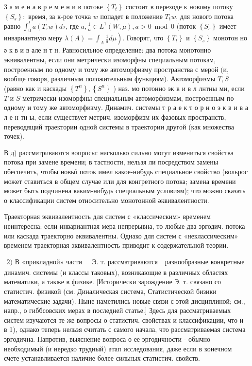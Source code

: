 \documentclass[10pt]{article}
\begin{document}
3 а м е н а в р е м е н и в потоке $\left\{T_{t}\right\}$ состоит в переходе к новому потоку $\left\{S_{s}\right\}:$ время, за к-рое точка $w$ попадет в положение $T_{t} w$, для нового потока равно $\int_{0}^{t} a\left(T_{\tau} w\right) d \tau$, где $a, \frac{1}{a} \in L^{1}(W, \mu), a>0 \bmod 0$ (поток $\left\{S_{s}\right\}$ имеет инвариантную меру $\left.\lambda(A)=\int_{A} \frac{1}{a} d \mu\right)$. Говорят, что $\left\{T_{t}\right\}$ и $\left\{S_{s}\right\}$ монотон но ә к в и в але н т н. Равносильное определение: два потока монотонно эквивалентны, если они метрически изоморфны специальным потокам, построенным по одному и тому же автоморфизму пространства с мерой (и, вообще говоря, различным положительным функциям). Автоморфизмы $T, S$ (равно как и каскады $\left\{T^{n}\right\},\left\{S^{n}\right\}$ ) наз. мо потонно эк в и в л лнтны ми, если $T$ и $S$ метрически изоморфны специальным автоморфизмам, построенным по одному и тому же автоморфизму. Динамич. системы т р а е к т о р н о э к в и в а л е н тн ы, если существует метрич. изоморфизм их фазовых пространств, переводящий траектории одной системы в траектории другой (как множества точек).



В д) рассматриваются вопросы: насколько сильно могут измениться свойства потока при замене времени; в тастности, нельзя ли посредством замены обеспечить, чтобы новыї поток имел какое-нибудь специальное свойство (вольрос может ставиться в общем случае или для конгретного потока; замена времени может быть подчинена каким-нибудь специальным условиям); что можно сказать о классификации систем относительно монотонной әквивалентности.



Траекторная эквивалентность для систем с «классическим» временем неинтересна: если инвариантная мера непрерывна, то любые два эргодич. потока или каскада траекторно әквивалентны. Однако для систем с «неклассическим» временем траекторная эквивалентность приводит к содержательной теории.



$\begin{array}{lll}2) \text { В «прикладной» части } & \text { Э. т. рассматриваются }\end{array}$ разнообразные конкретные динамич. системы (и классы таковых), возникающие в различных областях математики, а также в физике. [Исторически зарождение Э. т. связано со статистич. физикой (см. Диналическая система, Статистической бизики математические задачи). Ныне наметились новые связи с этой дисциплиной; см., напр., о гиббсовских мерах в последней статье.] Здесь для рассматриваемых систем изучаются те же вопросы о статистич. свойствах и классификации, что и в 1), однако теперь нельзя считать с самого начала, что рассматриваемая система эргодична. Напротив, выяснение вопроса о ее эргодичности - обычно необходимый (и нередко трудный) әтап исследования, даже если в конечном счете устанавливается наличие более сильных статистич. свойств.
\end{document}
